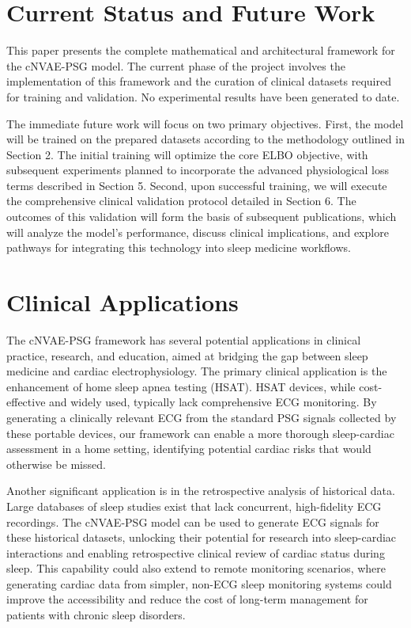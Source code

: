 \documentclass[11pt,en]{elegantpaper}
\begin{document}
\section{Current Status and Future Work}

This paper presents the complete mathematical and architectural framework for the cNVAE-PSG model. The current phase of the project involves the implementation of this framework and the curation of clinical datasets required for training and validation. No experimental results have been generated to date.

The immediate future work will focus on two primary objectives. First, the model will be trained on the prepared datasets according to the methodology outlined in Section 2. The initial training will optimize the core ELBO objective, with subsequent experiments planned to incorporate the advanced physiological loss terms described in Section 5. Second, upon successful training, we will execute the comprehensive clinical validation protocol detailed in Section 6. The outcomes of this validation will form the basis of subsequent publications, which will analyze the model's performance, discuss clinical implications, and explore pathways for integrating this technology into sleep medicine workflows.

\section{Clinical Applications}

The cNVAE-PSG framework has several potential applications in clinical practice, research, and education, aimed at bridging the gap between sleep medicine and cardiac electrophysiology. The primary clinical application is the enhancement of home sleep apnea testing (HSAT). HSAT devices, while cost-effective and widely used, typically lack comprehensive ECG monitoring. By generating a clinically relevant ECG from the standard PSG signals collected by these portable devices, our framework can enable a more thorough sleep-cardiac assessment in a home setting, identifying potential cardiac risks that would otherwise be missed.

Another significant application is in the retrospective analysis of historical data. Large databases of sleep studies exist that lack concurrent, high-fidelity ECG recordings. The cNVAE-PSG model can be used to generate ECG signals for these historical datasets, unlocking their potential for research into sleep-cardiac interactions and enabling retrospective clinical review of cardiac status during sleep. This capability could also extend to remote monitoring scenarios, where generating cardiac data from simpler, non-ECG sleep monitoring systems could improve the accessibility and reduce the cost of long-term management for patients with chronic sleep disorders.
\end{document}
